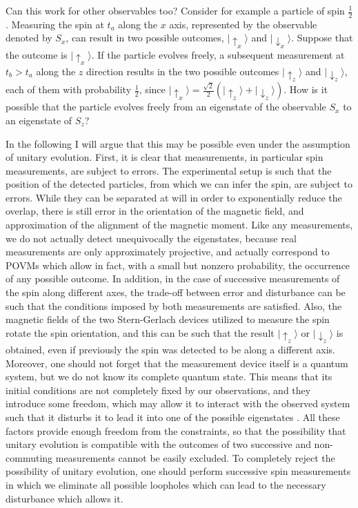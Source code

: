 \documentclass[11pt]{amsart}
\theoremstyle{definition}
\theoremstyle{plain}
\begin{document}
Can this work for other observables too? Consider for example a particle of spin $\frac 1 2$. Measuring the spin at $t_a$ along the $x$ axis, represented by the observable denoted by $S_x$, can result in two possible outcomes, $|{\uparrow_x}\rangle$ and $|{\downarrow_x}\rangle$. Suppose that the outcome is $|{\uparrow_x}\rangle$. If the particle evolves freely, a subsequent measurement at $t_b>t_a$ along the $z$ direction results in the two possible outcomes $|{\uparrow_z}\rangle$ and $|{\downarrow_z}\rangle$, each of them with probability $\frac 1 2$, since $|{\uparrow_x}\rangle = \frac{\sqrt 2}2\left(|{\uparrow_z}\rangle+|{\downarrow_z}\rangle\right)$. How is it possible that the particle evolves freely from an eigenstate of the observable $S_x$ to an eigenstate of $S_z$?

In the following I will argue that this may be possible even under the assumption of unitary evolution. First, it is clear that measurements, in particular spin measurements, are subject to errors. The experimental setup is such that the position of the detected particles, from which we can infer the spin, are subject to errors. While they can be separated at will in order to exponentially reduce the overlap, there is still error in the orientation of the magnetic field, and approximation of the alignment of the magnetic moment. Like any measurements, we do not actually detect unequivocally the eigenstates, because real measurements are only approximately projective, and actually correspond to POVMs which allow in fact, with a small but nonzero probability, the occurrence of any possible outcome. In addition, in the case of successive measurements of the spin along different axes, the trade-off between error and disturbance can be such that the conditions imposed by both measurements are satisfied. Also, the magnetic fields of the two Stern-Gerlach devices utilized to measure the spin rotate the spin orientation, and this can be such that the result $|{\uparrow_z}\rangle$ or $|{\downarrow_z}\rangle$ is obtained, even if previously the spin was detected to be along a different axis. Moreover, one should not forget that the measurement device itself is a quantum system, but we do not know its complete quantum state. This means that its initial conditions are not completely fixed by our observations, and they introduce some freedom, which may allow it to interact with the observed system such that it disturbs it to lead it into one of the possible eigenstates \cite{Sto08b,Sto12QMc}. All these factors provide enough freedom from the constraints, so that the possibility that unitary evolution is compatible with the outcomes of two successive and non-commuting measurements cannot be easily excluded. To completely reject the possibility of unitary evolution, one should perform successive spin measurements in which we eliminate all possible loopholes which can lead to the necessary disturbance which allows it.
\end{document}
